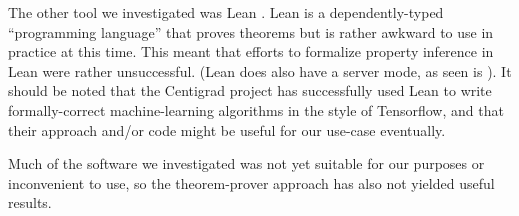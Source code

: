 \documentclass[12pt,letterpaper]{article}
\begin{document}
The other tool we investigated was Lean \cite{LeanIntro2017,Avigad2017}.
Lean is a dependently-typed ``programming language'' that proves theorems but is rather awkward to use in practice at this time.
This meant that efforts to formalize property inference in Lean were rather unsuccessful.
(Lean does also have a server mode, as seen is \cite{Lewis2017}).
It should be noted that the Centigrad project\cite{Selsam2017} has successfully used Lean to write formally-correct machine-learning algorithms in the style of Tensorflow, and that their approach and/or code might be useful for our use-case eventually.

Much of the software we investigated was not yet suitable for our purposes or inconvenient to use, so the theorem-prover approach has also not yielded useful results.

\printbibliography{}
\end{document}
